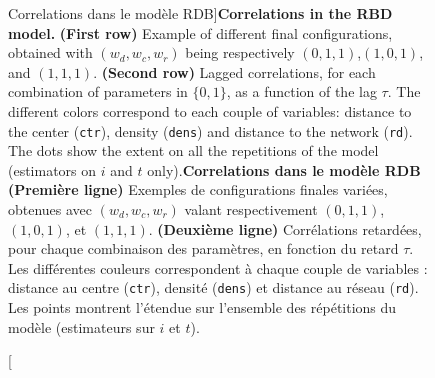 \begin{figure}
\caption[Correlation in the RBD model][Correlations dans le modèle RDB]{\textbf{Correlations in the RBD model.} \textbf{(First row)} Example of different final configurations, obtained with $(w_{d},w_{c},w_{r})$ being respectively $(0,1,1)$,$(1,0,1)$, and $(1,1,1)$. \textbf{(Second row)} Lagged correlations, for each combination of parameters in $\{0,1\}$, as a function of the lag $\tau$. The different colors correspond to each couple of variables: distance to the center (\texttt{ctr}), density (\texttt{dens}) and distance to the network (\texttt{rd}). The dots show the extent on all the repetitions of the model (estimators on $i$ and $t$ only).\label{fig:causalityregimes:exrdb}}{\textbf{Correlations dans le modèle RDB} \textbf{(Première ligne)} Exemples de configurations finales variées, obtenues avec $(w_{d},w_{c},w_{r})$ valant respectivement $(0,1,1)$,$(1,0,1)$, et $(1,1,1)$. \textbf{(Deuxième ligne)} Corrélations retardées, pour chaque combinaison des paramètres, en fonction du retard $\tau$. Les différentes couleurs correspondent à chaque couple de variables : distance au centre (\texttt{ctr}), densité (\texttt{dens}) et distance au réseau (\texttt{rd}). Les points montrent l'étendue sur l'ensemble des répétitions du modèle (estimateurs sur $i$ et $t$).\label{fig:causalityregimes:exrdb}}
\end{figure}



